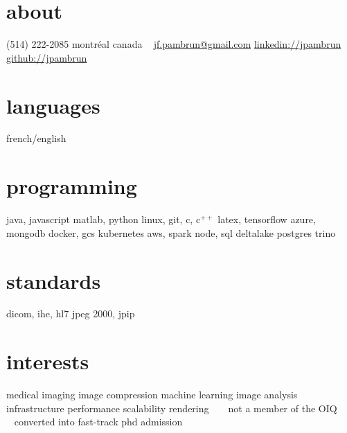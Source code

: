 \documentclass[print]{friggeri-cv}
\begin{document}

\newcommand{\eletr}{\href{http://www.etsmtl.ca/Programmes-Etudes/1er-cycle/Fiche-de-cours?Sigle=ELE747}{ele{\footnotesize747}}}
\newcommand{\eleenv}{\href{http://www.etsmtl.ca/Programmes-Etudes/1er-cycle/Fiche-de-cours?Sigle=ELE116}{ele{\footnotesize116}}}
\newcommand{\infmat}{\href{http://www.polymtl.ca/etudes/cours/details.php?sigle=INF1005a}{inf{\footnotesize1005}a}}
\newcommand{\gtssys}{\href{http://www.etsmtl.ca/Futurs-etudiants/Cycles-sup/Fiche-de-cours?Sigle=GTS840}{gts{\footnotesize840}}}

\begin{aside}
  \section{about}
  {\small(514) 222-2085}
  montréal
  canada
  ~
  \href{mailto:jf.pambrun@gmail.com}{jf.pambrun@gmail.com}
  \href{https://ca.linkedin.com/in/jpambrun}{linkedin://jpambrun}
  \href{http://github.com/jpambrun}{github://jpambrun}
  \section{languages}
  french/english
  \section{programming}
  java, javascript
  matlab, python
  linux, git, c, c{\tiny$^{++}$}
  latex, tensorflow
  azure, mongodb
  docker, gcs
  kubernetes
  aws, spark
  node, sql
  deltalake
  postgres
  trino
  \section{standards}
  dicom, ihe, hl{\small7}
  jpeg {\small2000}, jpip
  \section{interests}
  medical imaging
  image compression
  machine learning
  image analysis
  infrastructure
  performance
  scalability
  rendering
  ~\vspace{2cm}
  {\footnotesize\textdagger~ not a member of the OIQ\\\textdaggerdbl~ converted into fast-track phd admission}
\end{aside}
\end{document}
